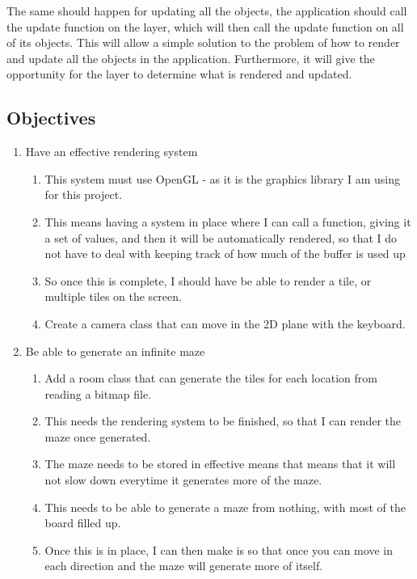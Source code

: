 \documentclass[../Main.tex]{subfiles}
\begin{document}
        The same should happen for updating all the objects, the application should call the update function on the layer, which will then call the update function on all of its objects. This will allow a simple solution to the problem of how to render and update all the objects in the application. Furthermore, it will give the opportunity for the layer to determine what is rendered and updated.
    \subsection{Objectives}
        \begin{enumerate}
            \item Have an effective rendering system
                \begin{enumerate}
                    \item This system must use OpenGL - as it is the graphics library I am using for this project.
                    \item This means having a system in place where I can call a function, giving it a set of values, and then it will be automatically rendered, so that I do not have to deal with keeping track of how much of the buffer is used up
                    \item So once this is complete, I should have be able to render a tile, or multiple tiles on the screen.
                    \item Create a camera class that can move in the 2D plane with the keyboard.
                \end{enumerate}
            \item Be able to generate an infinite maze
                \begin{enumerate}
                    \item Add a room class that can generate the tiles for each location from reading a bitmap file.
                    \item This needs the rendering system to be finished, so that I can render the maze once generated.
                    \item The maze needs to be stored in effective means that means that it will not slow down everytime it generates more of the maze.
                    \item This needs to be able to generate a maze from nothing, with most of the board filled up.
                    \item Once this is in place, I can then make is so that once you can move in each direction and the maze will generate more of itself.

\end{enumerate}
\end{enumerate}
\end{document}
